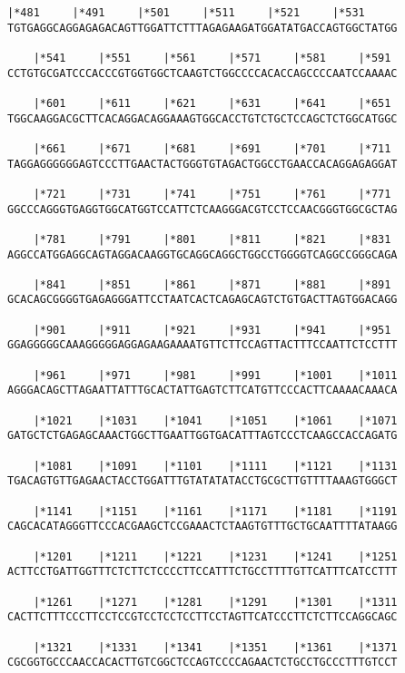 \documentclass{article}
\begin{document}
\begin{Verbatim}[fontfamily=courier]
    |*481     |*491     |*501     |*511     |*521     |*531 
TGTGAGGCAGGAGAGACAGTTGGATTCTTTAGAGAAGATGGATATGACCAGTGGCTATGG

    |*541     |*551     |*561     |*571     |*581     |*591 
CCTGTGCGATCCCACCCGTGGTGGCTCAAGTCTGGCCCCACACCAGCCCCAATCCAAAAC

    |*601     |*611     |*621     |*631     |*641     |*651 
TGGCAAGGACGCTTCACAGGACAGGAAAGTGGCACCTGTCTGCTCCAGCTCTGGCATGGC

    |*661     |*671     |*681     |*691     |*701     |*711 
TAGGAGGGGGGAGTCCCTTGAACTACTGGGTGTAGACTGGCCTGAACCACAGGAGAGGAT

    |*721     |*731     |*741     |*751     |*761     |*771 
GGCCCAGGGTGAGGTGGCATGGTCCATTCTCAAGGGACGTCCTCCAACGGGTGGCGCTAG

    |*781     |*791     |*801     |*811     |*821     |*831 
AGGCCATGGAGGCAGTAGGACAAGGTGCAGGCAGGCTGGCCTGGGGTCAGGCCGGGCAGA

    |*841     |*851     |*861     |*871     |*881     |*891 
GCACAGCGGGGTGAGAGGGATTCCTAATCACTCAGAGCAGTCTGTGACTTAGTGGACAGG

    |*901     |*911     |*921     |*931     |*941     |*951 
GGAGGGGGCAAAGGGGGAGGAGAAGAAAATGTTCTTCCAGTTACTTTCCAATTCTCCTTT

    |*961     |*971     |*981     |*991     |*1001    |*1011
AGGGACAGCTTAGAATTATTTGCACTATTGAGTCTTCATGTTCCCACTTCAAAACAAACA

    |*1021    |*1031    |*1041    |*1051    |*1061    |*1071
GATGCTCTGAGAGCAAACTGGCTTGAATTGGTGACATTTAGTCCCTCAAGCCACCAGATG

    |*1081    |*1091    |*1101    |*1111    |*1121    |*1131
TGACAGTGTTGAGAACTACCTGGATTTGTATATATACCTGCGCTTGTTTTAAAGTGGGCT

    |*1141    |*1151    |*1161    |*1171    |*1181    |*1191
CAGCACATAGGGTTCCCACGAAGCTCCGAAACTCTAAGTGTTTGCTGCAATTTTATAAGG

    |*1201    |*1211    |*1221    |*1231    |*1241    |*1251
ACTTCCTGATTGGTTTCTCTTCTCCCCTTCCATTTCTGCCTTTTGTTCATTTCATCCTTT

    |*1261    |*1271    |*1281    |*1291    |*1301    |*1311
CACTTCTTTCCCTTCCTCCGTCCTCCTCCTTCCTAGTTCATCCCTTCTCTTCCAGGCAGC

    |*1321    |*1331    |*1341    |*1351    |*1361    |*1371
CGCGGTGCCCAACCACACTTGTCGGCTCCAGTCCCCAGAACTCTGCCTGCCCTTTGTCCT

\end{Verbatim}
\newpage
\end{document}
